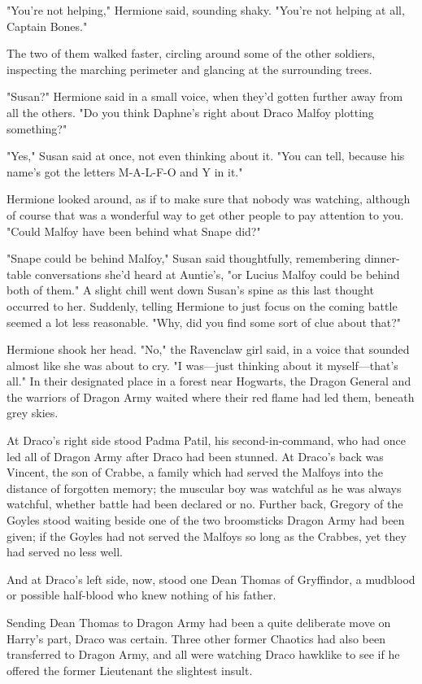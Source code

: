 "You're not helping," Hermione said, sounding shaky. "You're not helping at 
all, Captain Bones."

The two of them walked faster, circling around some of the other soldiers, 
inspecting the marching perimeter and glancing at the surrounding trees.

"Susan?" Hermione said in a small voice, when they'd gotten further away from 
all the others. "Do you think Daphne's right about Draco Malfoy plotting 
something?"

"Yes," Susan said at once, not even thinking about it. "You can tell, because 
his name's got the letters M-A-L-F-O and Y in it."

Hermione looked around, as if to make sure that nobody was watching, although 
of course that was a wonderful way to get other people to pay attention to you. 
"Could Malfoy have been behind what Snape did?"

"Snape could be behind Malfoy," Susan said thoughtfully, remembering 
dinner-table conversations she'd heard at Auntie's, "or Lucius Malfoy could be 
behind both of them." A slight chill went down Susan's spine as this last 
thought occurred to her. Suddenly, telling Hermione to just focus on the coming 
battle seemed a lot less reasonable. "Why, did you find some sort of clue about 
that?"

Hermione shook her head. "No," the Ravenclaw girl said, in a voice that sounded 
almost like she was about to cry. "I was---just thinking about it 
myself---that's all."
\sbreak
In their designated place in a forest near Hogwarts, the Dragon General and the 
warriors of Dragon Army waited where their red flame had led them, beneath grey 
skies.

At Draco's right side stood Padma Patil, his second-in-command, who had once 
led all of Dragon Army after Draco had been stunned. At Draco's back was 
Vincent, the son of Crabbe, a family which had served the Malfoys into the 
distance of forgotten memory; the muscular boy was watchful as he was always 
watchful, whether battle had been declared or no. Further back, Gregory of the 
Goyles stood waiting beside one of the two broomsticks Dragon Army had been 
given; if the Goyles had not served the Malfoys so long as the Crabbes, yet 
they had served no less well.

And at Draco's left side, now, stood one Dean Thomas of Gryffindor, a mudblood 
or possible half-blood who knew nothing of his father.

Sending Dean Thomas to Dragon Army had been a quite deliberate move on Harry's 
part, Draco was certain. Three other former Chaotics had also been transferred 
to Dragon Army, and all were watching Draco hawklike to see if he offered the 
former Lieutenant the slightest insult.

